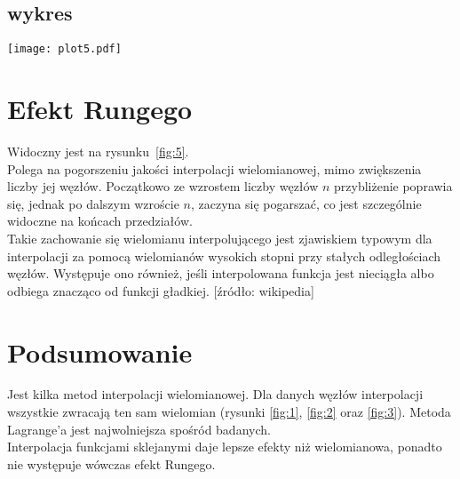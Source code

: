 \subsection{\bf wykres}
\begin{center}
    \texttt{[image: plot5.pdf]}
    \label{fig:5}
\end{center}

\section{\bf Efekt Rungego}
\noindent Widoczny jest na rysunku~\ref{fig:5}.\\
Polega na pogorszeniu jakości interpolacji wielomianowej, mimo 
zwiększenia liczby jej węzłów. Początkowo ze wzrostem liczby węzłów 
$n$ przybliżenie poprawia się, jednak po dalszym wzroście $n$, zaczyna 
się pogarszać, co jest szczególnie widoczne na końcach przedziałów.\\
Takie zachowanie się wielomianu interpolującego jest zjawiskiem typowym 
dla interpolacji za pomocą wielomianów wysokich stopni przy stałych 
odległościach węzłów. Występuje ono również, jeśli interpolowana funkcja
jest nieciągła albo odbiega znacząco od funkcji gładkiej. [źródło: wikipedia]
\clearpage
\section{\bf Podsumowanie}
\noindent Jest kilka metod interpolacji wielomianowej. Dla danych węzłów
interpolacji wszystkie zwracają ten sam wielomian 
(rysunki \ref{fig:1}, \ref{fig:2} oraz \ref{fig:3}).
Metoda Lagrange'a jest najwolniejsza spośród badanych.\\
Interpolacja funkcjami sklejanymi daje lepsze efekty niż wielomianowa,
ponadto nie występuje wówczas efekt Rungego.
\vspace{2cm}

\tableofcontents

